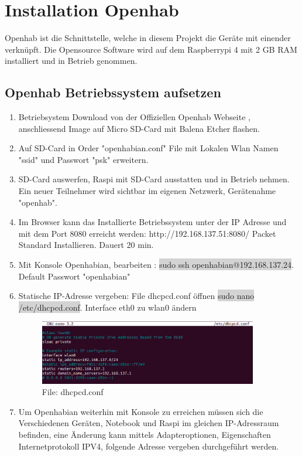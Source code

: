 \clearpage
\section{Installation Openhab}\label{sec:Openhab}
Openhab ist die Schnittstelle, welche in diesem Projekt die Geräte mit einender verknüpft. Die Opensource Software wird auf dem Raspberrypi 4 mit 2 GB RAM installiert und in Betrieb genommen. 

\subsection{Openhab Betriebssystem aufsetzen}
\begin{enumerate}
	\item Betriebsystem Download von der Offiziellen Openhab Webseite \cite{noauthor_download_nodate-1}, anschliessend Image auf Micro SD-Card mit Balena Etcher flashen.
   \item Auf SD-Card in Order "openhabian.conf" File mit Lokalen Wlan Namen "ssid" und Passwort "psk" erweitern.
   \item SD-Card auswerfen, Raspi mit SD-Card ausstatten und in Betrieb nehmen. Ein neuer Teilnehmer wird sichtbar im eigenen Netzwerk, Gerätenahme "openhab".
   \item Im Browser kann das Installierte Betriebssystem unter der IP Adresse und mit dem Port 8080 erreicht werden: http://192.168.137.51:8080/ Packet Standard Installieren. Dauert 20 min.
   \item Mit Konsole Openhabian, bearbeiten : \colorbox{lightgray}{sudo ssh openhabian@192.168.137.24}. \\
   Default Passwort "openhabian"
   \item Statische IP-Adresse vergeben: File dhcpcd.conf öffnen \colorbox{lightgray}{sudo nano /etc/dhcpcd.conf}. Interface eth0 zu wlan0 ändern 
   \begin{figure}[H]
   	\centering
   	\includegraphics[width=0.9\textwidth]{graphics/dhcpcd.png}
   	\caption{File: dhcpcd.conf} 	
   	\label{pic: dhcpcd}
   \end{figure} 
\item Um Openhabian weiterhin mit Konsole zu erreichen müssen sich die Verschiedenen Geräten, Notebook und Raspi im gleichen IP-Adressraum befinden, eine Änderung kann mittels Adapteroptionen, Eigenschaften Internetprotokoll IPV4, folgende Adresse vergeben durchgeführt werden.


\end{enumerate}
